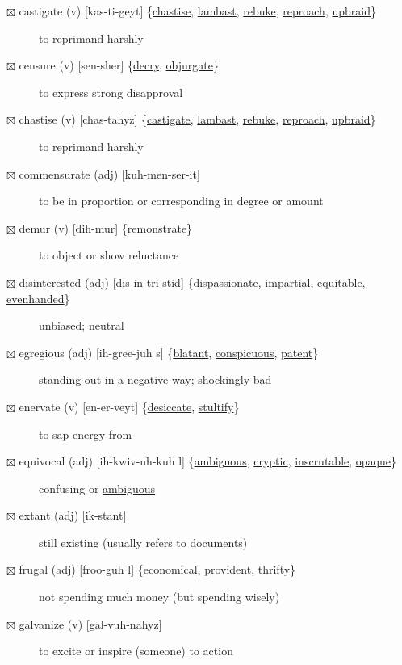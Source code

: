 \documentclass[11pt]{article}
\begin{document}
\begin{description}
\item[{$\boxtimes$ \label{org41ed9c5}castigate (v) [kas-ti-geyt] \{\hyperref[org578f0de]{chastise}, \hyperref[orgcb82180]{lambast}, \hyperref[org05472f9]{rebuke}, \hyperref[org3cb95b6]{reproach}, \hyperref[org6b90e9e]{upbraid}\}}] to reprimand harshly
\item[{$\boxtimes$ \label{orge8a51e2}censure (v) [sen-sher] \{\hyperref[org7e8d517]{decry}, \hyperref[orgd45e5c5]{objurgate}\}}] to express strong disapproval
\item[{$\boxtimes$ \label{org578f0de}chastise (v) [chas-tahyz] \{\hyperref[org41ed9c5]{castigate}, \hyperref[orgcb82180]{lambast}, \hyperref[org05472f9]{rebuke}, \hyperref[org3cb95b6]{reproach}, \hyperref[org6b90e9e]{upbraid}\}}] to reprimand harshly
\item[{$\boxtimes$ commensurate (adj) [kuh-men-ser-it]}] to be in proportion or corresponding in degree or amount
\item[{$\boxtimes$ \label{org09f4137}demur (v) [dih-mur] \{\hyperref[orge262f48]{remonstrate}\}}] to object or show reluctance
\item[{$\boxtimes$ \label{org12598d9}disinterested (adj) [dis-in-tri-stid] \{\hyperref[org49e3d5e]{dispassionate}, \hyperref[orgce681fa]{impartial}, \hyperref[org7398f3e]{equitable}, \hyperref[org142d9b2]{evenhanded}\}}] unbiased; neutral
\item[{$\boxtimes$ \label{org178f47e}egregious (adj) [ih-gree-juh s] \{\hyperref[org1b61d78]{blatant}, \hyperref[org6c56ea5]{conspicuous}, \hyperref[org70fed6f]{patent}\}}] standing out in a negative way; shockingly bad
\item[{$\boxtimes$ \label{org2b95d9b} \label{org985e694}enervate (v) [en-er-veyt] \{\hyperref[orge9b51d7]{desiccate}, \hyperref[orgf2ecf81]{stultify}\}}] to sap energy from
\item[{$\boxtimes$ \label{orgd229018}equivocal (adj) [ih-kwiv-uh-kuh l] \{\hyperref[orgc4611e5]{ambiguous}, \hyperref[org55b5c86]{cryptic}, \hyperref[org3d97e2d]{inscrutable}, \hyperref[org26d66c4]{opaque}\}}] confusing or \hyperref[orgc4611e5]{ambiguous}
\item[{$\boxtimes$ extant (adj) [ik-stant]}] still existing (usually refers to documents)
\item[{$\boxtimes$ \label{org0d99c47}frugal (adj) [froo-guh l] \{\hyperref[orgcae06d1]{economical}, \hyperref[org6590548]{provident}, \hyperref[org7c1d566]{thrifty}\}}] not spending much money (but spending wisely)
\item[{$\boxtimes$ galvanize (v) [gal-vuh-nahyz]}] to excite or inspire (someone) to action

\end{description}
\end{document}
